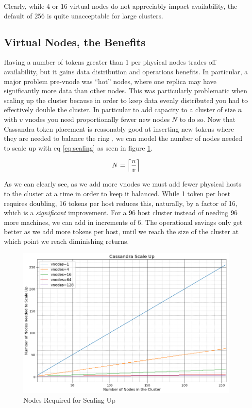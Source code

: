 \documentclass{article}
\DeclarePairedDelimiter{\ceil}{\lceil}{\rceil}
\begin{document}
Clearly, while 4 or 16 virtual nodes do not appreciably impact availability,
the default of 256 is quite unacceptable for large clusters.

\subsection{Virtual Nodes, the Benefits}

Having a number of tokens greater than 1 per physical nodes trades off
availability, but it gains data distribution and operations benefits. In
particular, a major problem pre-vnode was ``hot'' nodes, where one replica
may have significantly more data than other nodes. This was particularly
problematic when scaling up the cluster because in order to keep data evenly
distributed you had to effectively double the cluster. In particular to add
capacity to a cluster of size $n$ with $v$ vnodes you need proportionally fewer
new nodes $N$ to do so. Now that Cassandra token placement is reasonably good
at inserting new tokens where they are needed to balance the ring
\cite{tokenallocation}, we can model the number of nodes needed to scale up
with eq \ref{eq:scaling} as seen in figure \ref{fig:scaling}.

\begin{equation} \label{eq:scaling}
    N = \ceil*{\frac{n}{v}}
\end{equation}

As we can clearly see, as we add more vnodes we must add fewer
physical hosts to the cluster at a time in order to keep it balanced. While 1
token per host requires doubling, 16 tokens per host reduces this, naturally,
by a factor of 16, which is a \textit{significant} improvement. For a 96 host
cluster instead of needing 96 more machines, we can add in increments of 6. The
operational savings only get better as we add more tokens per host, until we
reach the size of the cluster at which point we reach diminishing returns.

\begin{figure}[H]
    \centering
    \includegraphics[width=1.0\textwidth]{images/scale_up.png}
    \caption{Nodes Required for Scaling Up}
    \label{fig:scaling}
\end{figure}
\end{document}
